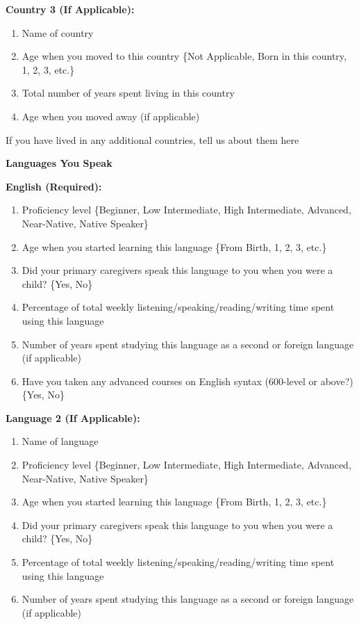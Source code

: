 \textbf{Country 3 (If Applicable):}
\begin{enumerate}
\item Name of country
\item Age when you moved to this country \{Not Applicable, Born in this country, 1, 2, 3, etc.\}
\item Total number of years spent living in this country
\item Age when you moved away (if applicable)
\end{enumerate}\vspace{10pt}

If you have lived in any additional countries, tell us about them here\vspace{10pt}

\textbf{Languages You Speak}\\\vspace{5pt}

\textbf{English (Required):} 
\begin{enumerate}
\item Proficiency level \{Beginner, Low Intermediate, High Intermediate, Advanced, Near-Native, Native Speaker\}
\item Age when you started learning this language \{From Birth, 1, 2, 3, etc.\}
\item Did your primary caregivers speak this language to you when you were a child? \{Yes, No\}
\item Percentage of total weekly listening/speaking/reading/writing time spent using this language
\item Number of years spent studying this language as a second or foreign language (if applicable)
\item Have you taken any advanced courses on English syntax (600-level or above?) \{Yes, No\}
\end{enumerate}\vspace{10pt}

\textbf{Language 2 (If Applicable):}
\begin{enumerate}
\item Name of language
\item Proficiency level \{Beginner, Low Intermediate, High Intermediate, Advanced, Near-Native, Native Speaker\}
\item Age when you started learning this language \{From Birth, 1, 2, 3, etc.\}
\item Did your primary caregivers speak this language to you when you were a child? \{Yes, No\}
\item Percentage of total weekly listening/speaking/reading/writing time spent using this language
\item Number of years spent studying this language as a second or foreign language (if applicable)
\end{enumerate}\vspace{10pt}

